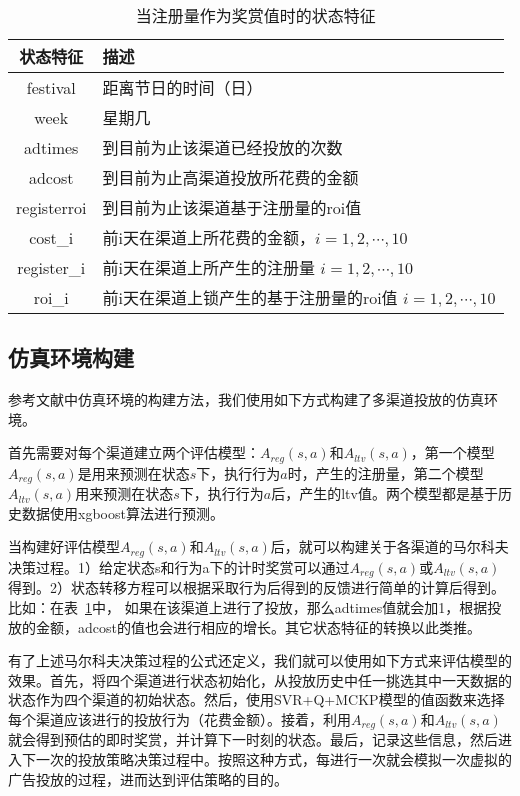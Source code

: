 \begin{table}[htbp]
  \centering
  \caption{当注册量作为奖赏值时的状态特征}
  \label{tab:obser_ad_register}
  \begin{tabular}{cl}
    \toprule
      状态特征 & 描述 \\
    \midrule
      festival & 距离节日的时间（日） \\
      week & 星期几 \\
      adtimes & 到目前为止该渠道已经投放的次数 \\
      adcost & 到目前为止高渠道投放所花费的金额 \\
      registerroi & 到目前为止该渠道基于注册量的roi值 \\
      cost_i & 前i天在渠道上所花费的金额，$i=1,2,\cdots,10$ \\
      register_i & 前i天在渠道上所产生的注册量 $i=1,2,\cdots,10$\\
      roi_i & 前i天在渠道上锁产生的基于注册量的roi值 $i=1,2,\cdots,10$\\
    \bottomrule
  \end{tabular}
\end{table}

\subsection{仿真环境构建}
参考文献\citep{pednault2002sequential}中仿真环境的构建方法，我们使用如下方式构建了多渠道投放的仿真环境。

首先需要对每个渠道建立两个评估模型：$A_{reg}(s,a)$和$A_{ltv}(s,a)$，第一个模型$A_{reg}(s,a)$是用来预测在状态$s$下，执行行为$a$时，产生的注册量，第二个模型$A_{ltv}(s,a)$用来预测在状态$s$下，执行行为$a$后，产生的ltv值。两个模型都是基于历史数据使用xgboost算法进行预测。

当构建好评估模型$A_{reg}(s,a)$和$A_{ltv}(s,a)$后，就可以构建关于各渠道的马尔科夫决策过程。1）给定状态s和行为a下的计时奖赏可以通过$A_{reg}(s,a)$或$A_{ltv}(s,a)$得到。2）状态转移方程可以根据采取行为后得到的反馈进行简单的计算后得到。比如：在表~\ref{tab:obser_ad_register}中，
如果在该渠道上进行了投放，那么adtimes值就会加1，根据投放的金额，adcost的值也会进行相应的增长。其它状态特征的转换以此类推。

有了上述马尔科夫决策过程的公式还定义，我们就可以使用如下方式来评估模型的效果。首先，将四个渠道进行状态初始化，从投放历史中任一挑选其中一天数据的状态作为四个渠道的初始状态。然后，使用SVR+Q+MCKP模型的值函数来选择每个渠道应该进行的投放行为（花费金额）。接着，利用$A_{reg}(s,a)$和$A_{ltv}(s,a)$就会得到预估的即时奖赏，并计算下一时刻的状态。最后，记录这些信息，然后进入下一次的投放策略决策过程中。按照这种方式，每进行一次就会模拟一次虚拟的广告投放的过程，进而达到评估策略的目的。

